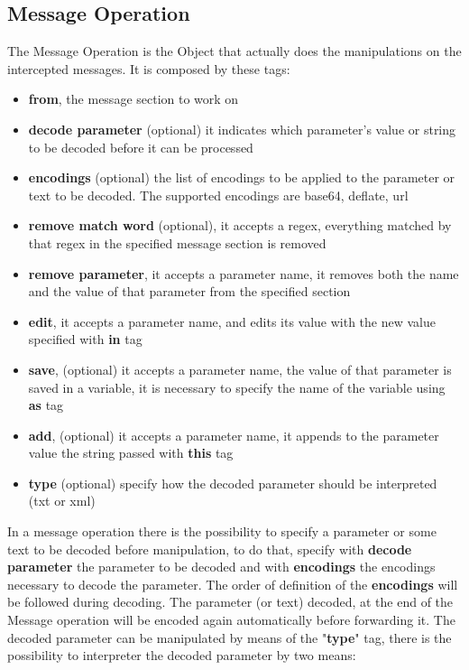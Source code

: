 \subsection{Message Operation}
The Message Operation is the Object that actually does the manipulations on the intercepted messages. It is composed by these tags:
\begin{itemize}
    \item \textbf{from}, the message section to work on
    \item \textbf{decode parameter} (optional) it indicates which parameter's value or string to be decoded before it can be processed
    \item \textbf{encodings} (optional) the list of encodings to be applied to the parameter or text to be decoded. The supported encodings are base64, deflate, url
    \item \textbf{remove match word} (optional), it accepts a regex, everything matched by that regex in the specified message section is removed
    \item \textbf{remove parameter}, it accepts a parameter name, it removes both the name and the value of that parameter from the specified section
    \item \textbf{edit}, it accepts a parameter name, and edits its value with the new value specified with \textbf{in} tag
    \item \textbf{save}, (optional) it accepts a parameter name, the value of that parameter is saved in a variable, it is necessary to specify the name of the variable using \textbf{as} tag
    \item \textbf{add}, (optional) it accepts a parameter name, it appends to the parameter value the string passed with \textbf{this} tag
    \item \textbf{type} (optional) specify how the decoded parameter should be interpreted (txt or xml)
\end{itemize}

In a message operation there is the possibility to specify a parameter or some text to be decoded before manipulation, to do that, specify with \textbf{decode parameter} the parameter to be decoded and with \textbf{encodings} the encodings necessary to decode the parameter. The order of definition of the \textbf{encodings} will be followed during decoding. The parameter (or text) decoded, at the end of the Message operation will be encoded again automatically before forwarding it.
The decoded parameter can be manipulated by means of the "\textbf{type}" tag, there is the possibility to interpreter the decoded parameter by two means: 


